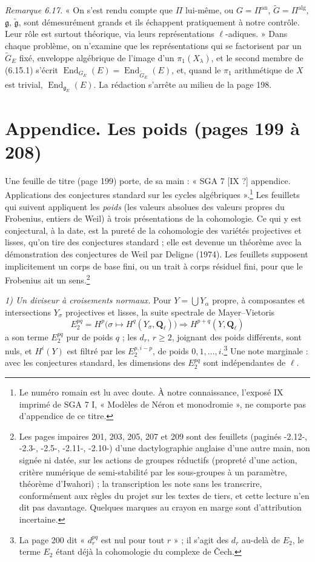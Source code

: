 \documentclass[11pt,a4paper]{article}
\begin{document}
\emph{Remarque 6.17.} « On s'est rendu compte que $\Pi$ lui-même, ou $G =
\Pi^{\mathrm{an}}$, $\widetilde G = \Pi^{\mathrm{alg}}$, $\mathfrak{g}$,
$\widetilde{\mathfrak{g}}$, sont démesurément grands et ils échappent pratiquement
à notre contrôle. Leur rôle est surtout théorique, via leurs représentations
$\ell$-adiques. » Dans chaque problème, on n'examine que les représentations qui
se factorisent par un $\widetilde G_E$ fixé, enveloppe algébrique de l'image d'un
$\pi_1(X_\lambda)$, et le second membre de (6.15.1) s'écrit
$\operatorname{End}_{G_E}(E) = \operatorname{End}_{\widetilde G_E}(E)$, et,
quand le $\pi_1$ arithmétique de $X$ est trivial, $\operatorname{End}_{\mathfrak{g}_E}(E)$.
La rédaction s'arrête au milieu de la page 198.

\section*{Appendice. Les poids (pages 199 à 208)}

Une feuille de titre (page 199) porte, de sa main : « SGA 7 [IX ?] appendice.
Applications des conjectures standard sur les cycles algébriques ».\footnote{Le
numéro romain est lu avec doute. À notre connaissance, l'exposé IX imprimé de
SGA 7 I, « Modèles de Néron et monodromie », ne comporte pas d'appendice de ce
titre.} Les feuillets qui suivent appliquent les \emph{poids} (les valeurs
absolues des valeurs propres du Frobenius, entiers de Weil) à trois
présentations de la cohomologie. Ce qui y est conjectural, à la date, est la
pureté de la cohomologie des variétés projectives et lisses, qu'on tire des
conjectures standard ; elle est devenue un théorème avec la démonstration des
conjectures de Weil par Deligne (1974). Les feuillets supposent implicitement
un corps de base fini, ou un trait à corps résiduel fini, pour que le Frobenius
ait un sens.\footnote{Les pages impaires 201, 203, 205, 207 et 209 sont des
feuillets (paginés -2.12-, -2.3-, -2.5-, -2.11-, -2.10-) d'une dactylographie
anglaise d'une autre main, non signée ni datée, sur les actions de groupes
réductifs (propreté d'une action, critère numérique de semi-stabilité par les
sous-groupes à un paramètre, théorème d'Iwahori) ; la transcription les note sans
les transcrire, conformément aux règles du projet sur les textes de tiers, et
cette lecture n'en dit pas davantage. Quelques marques au crayon en marge sont
d'attribution incertaine.}

\emph{1) Un diviseur à croisements normaux.} Pour $Y = \bigcup Y_\alpha$ propre,
à composantes et intersections $Y_\sigma$ projectives et lisses, la suite
spectrale de Mayer--Vietoris
\[
  E_2^{pq} = H^p\bigl(\sigma \mapsto H^q(Y_\sigma, \mathbf{Q}_\ell)\bigr)
  \Longrightarrow H^{p+q}(Y, \mathbf{Q}_\ell)
\]
a son terme $E_2^{pq}$ pur de poids $q$ ; les $d_r$, $r \geq 2$, joignant des
poids différents, sont nuls, et $H^i(Y)$ est filtré par les $E_2^{p,i-p}$, de
poids $0, 1, \ldots, i$.\footnote{La page 200 dit « $d_r^{pq}$ est nul pour tout
$r$ » ; il s'agit des $d_r$ au-delà de $E_2$, le terme $E_2$ étant déjà la
cohomologie du complexe de Čech.} Une note marginale : avec les conjectures
standard, les dimensions des $E_2^{pq}$ sont indépendantes de $\ell$.
\end{document}
